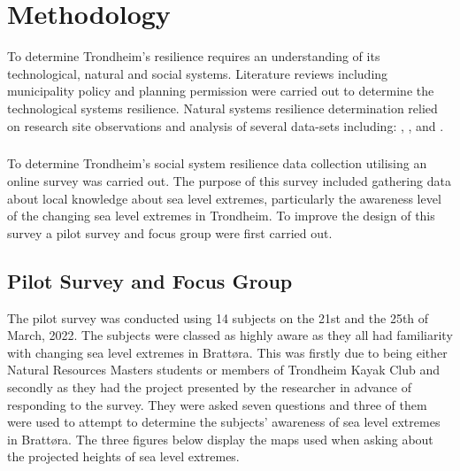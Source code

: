 
\chapter{Methodology}
To determine Trondheim's resilience requires an understanding of its technological, natural and social systems. Literature reviews including municipality policy and planning permission were carried out to determine the technological systems resilience. Natural systems resilience determination relied on research site observations and analysis of several  data-sets including: \cite{geonorge_stormflo_nodate} , \cite{kartverket_se_2021}, \cite{stormflo_database_stormflo_2021} and \cite{ipcc_sea_2021}. 
\paragraph{}
To determine Trondheim's social system resilience data collection utilising an online survey was carried out. The purpose of this survey included gathering data about local knowledge about sea level extremes, particularly the awareness level of the changing sea level extremes in Trondheim. To improve the design of this survey a pilot survey and focus group were first carried out.  

\section{Pilot Survey and Focus Group}

The pilot survey was conducted using 14 subjects on the 21st and the 25th of March, 2022. The subjects were classed as highly aware as they all had familiarity with changing sea level extremes in Brattøra. This was firstly due to being either Natural Resources Masters students or members of Trondheim Kayak Club and secondly as they had the project presented by the researcher in advance of responding to the survey. They were asked seven questions and three of them were used to attempt to determine the subjects' awareness of sea level extremes in Brattøra. The three figures below display the maps used when asking about the projected heights of sea level extremes.

